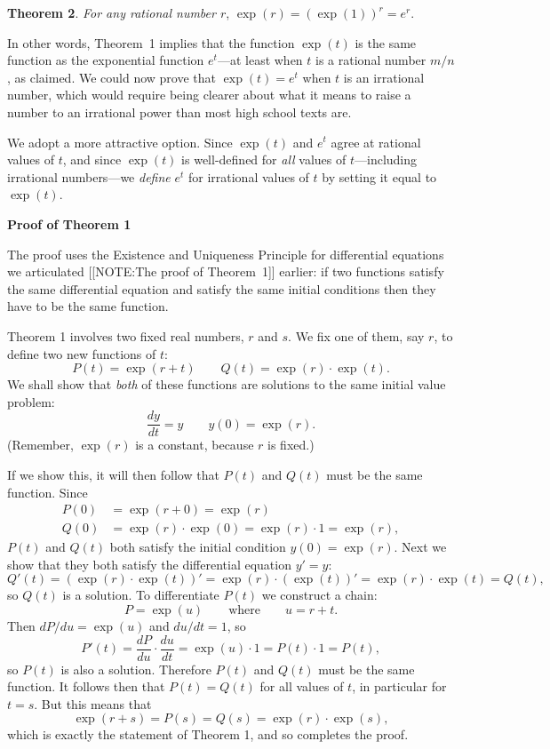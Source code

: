 {\bf Theorem 2}.  {\em For any rational number\/ $r$}, $\exp(r) = \left( \exp(1) \right)^{\displaystyle r} = e^{\displaystyle r}$.



	In other words, Theorem~1 implies that the function $\exp(t)$ is the same function as the exponential function $e^t$---at least when $t$ is a rational number $m/n$, as claimed.  We could now prove that $\exp(t)=e^t$ when $t$ is an irrational number, which would require being clearer about what it means to raise a number to an irrational power than most high school texts are.  

We adopt a more attractive option.  Since $\exp(t)$ and $e^t$ agree at rational values of $t$, and since $\exp(t)$ is well-defined for {\em all} values of $t$---including irrational numbers---we {\em define} $e^t$ for irrational values of $t$ by setting it equal to $\exp(t)$.




{\bf Proof of Theorem 1}


The proof uses the Existence and Uniqueness Principle for differential equations we articulated  	[[NOTE:The proof of Theorem~1]]
earlier:  if two functions satisfy the same differential equation and satisfy the same initial conditions then they have to be the same function.

	Theorem 1 involves two fixed real numbers, $r$ and $s$.  
We fix one of them, say $r$, to define two new functions of $t$:
	\[
P(t) = \exp(r + t) \qquad Q(t) = \exp(r) \cdot \exp(t).
\]
We shall show that {\em both\/} of these functions are solutions to the same initial value problem:
	\[
\dfrac{dy}{dt} = y \qquad y(0) = \exp(r).
\]
(Remember, $\exp(r)$ is a constant, because $r$ is fixed.)  

If we show this, it will then follow that $P(t)$ and $Q(t)$ must be
the same function. Since
\begin{align*}
P(0) &= \exp(r + 0) = \exp(r) \\
Q(0) &= \exp(r) \cdot \exp(0) = \exp(r) \cdot 1 = \exp(r),
\end{align*}
$P(t)$ and $Q(t)$ both satisfy the initial condition $y(0) = \exp(r)$.
Next we show that they both satisfy the differential equation $y' = y$:
	\[
Q'(t) = \left(\exp(r) \cdot \exp(t) \right)' =
		\exp(r) \cdot \left(\exp(t) \right)'= 
		\exp(r) \cdot \exp(t) = Q(t),
\]
so $Q(t)$ is a solution.  To differentiate $P(t)$ we construct a chain:
	\[
P = \exp(u) \qquad \mbox{where} \qquad u = r+ t.
\]
Then $dP/du = \exp(u)$ and $du/dt = 1$, so
	\[
P'(t) = \dfrac{dP}{du} \cdot \dfrac{du}{dt} = 
		\exp(u) \cdot 1 = P(t) \cdot 1 = P(t),
\] 
so $P(t)$ is also a solution.  Therefore $P(t)$ and $Q(t)$ must be the
same function.  It follows then that $P(t)=Q(t)$ for all values of
$t$, in particular for $t=s$.  But this means that
	\[
\exp(r + s) = P(s) = Q(s) = \exp(r) \cdot \exp(s),
\]
which is exactly the statement of Theorem 1, and so completes the proof.




